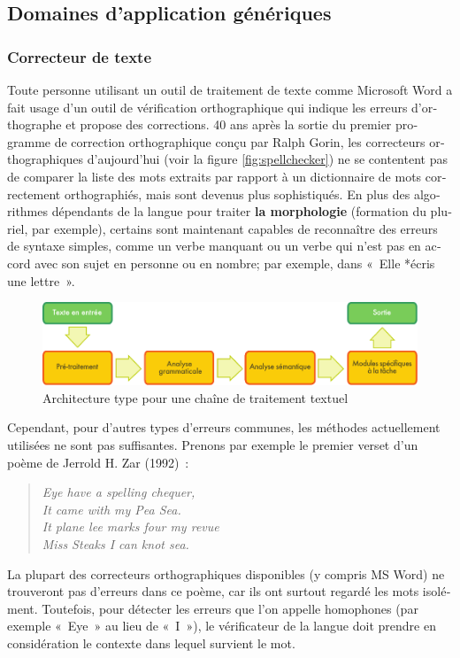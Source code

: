 \begin{french}
\begin{multicols}{2}
\subsection{Domaines d'application génériques}
%
\subsubsection{Correcteur de texte}
%
Toute personne utilisant un outil de traitement de texte comme
Microsoft Word a fait usage d'un outil de vérification orthographique
qui indique les erreurs d'orthographe et propose des corrections.  40
ans après la sortie du premier programme de correction orthographique
conçu par Ralph Gorin, les correcteurs orthographiques d'aujourd'hui
(voir la figure \ref{fig:spellchecker}) ne se contentent pas de
comparer la liste des mots extraits par rapport à un dictionnaire de
mots correctement orthographiés, mais sont devenus plus
sophistiqués. En plus des algorithmes dépendants de la langue pour
traiter {\bf la morphologie} (formation du pluriel, par exemple),
certains sont maintenant capables de reconnaître des erreurs de
syntaxe simples, comme un verbe manquant ou un verbe qui n'est pas en
accord avec son sujet en personne ou en nombre; par exemple, dans
«~Elle *écris une lettre~».

\begin{figure}[t]
\begin{center}
 \includegraphics[width=\textwidth]{../_media/french/text_processing_app_architecture}
\caption{Architecture type pour une chaîne de traitement textuel}
\label{fig:textprocarchi}
\end{center}
\end{figure}

Cependant, pour d'autres types d'erreurs communes, les
méthodes actuellement utilisées ne sont pas suffisantes. Prenons par
exemple le premier verset d'un poème de Jerrold H. Zar
(1992)~:

\begin{quote}
{\em Eye have a spelling chequer,\\
It came with my Pea Sea.\\
It plane lee marks four my revue\\
Miss Steaks I can knot sea.}\\
\end{quote}
La plupart des correcteurs orthographiques disponibles (y compris MS
Word) ne trouveront pas d'erreurs dans ce poème, car ils ont surtout
regardé les mots isolément. Toutefois, pour détecter les erreurs que
l'on appelle homophones (par exemple «~Eye~» au lieu de «~I~»), le
vérificateur de la langue doit prendre en considération le contexte
dans lequel survient le mot.


\end{multicols}
\end{french}
